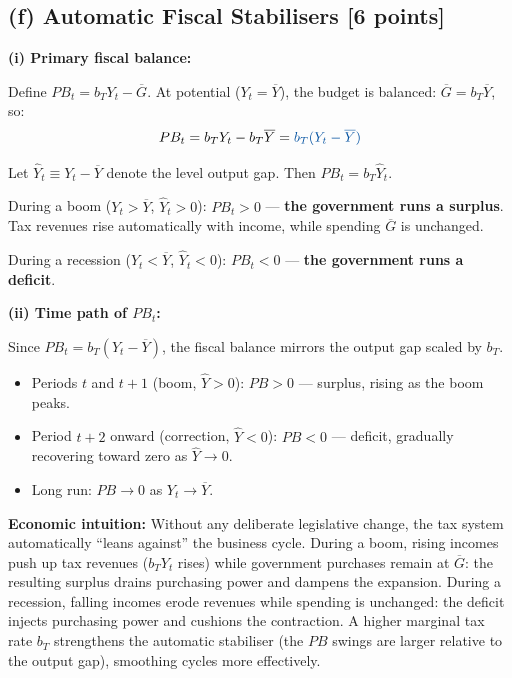 \documentclass[letterpaper,12pt]{article}
\begin{document}
\subsection*{(f) Automatic Fiscal Stabilisers [6 points]}

\noindent\textbf{(i) Primary fiscal balance:}

Define $PB_t = b_T Y_t - \overline{G}$. At potential ($Y_t = \overline{Y}$), the budget is balanced: $\overline{G} = b_T\overline{Y}$, so:
\[
PB_t = b_T Y_t - b_T\overline{Y} = \textcolor{sol}{b_T(Y_t - \overline{Y})}
\]

Let $\hat{Y}_t \equiv Y_t - \overline{Y}$ denote the level output gap. Then $PB_t = b_T \hat{Y}_t$.

During a boom ($Y_t > \overline{Y}$, $\hat{Y}_t > 0$): $PB_t > 0$ — \textbf{the government runs a surplus}. Tax revenues rise automatically with income, while spending $\overline{G}$ is unchanged.

During a recession ($Y_t < \overline{Y}$, $\hat{Y}_t < 0$): $PB_t < 0$ — \textbf{the government runs a deficit}.

\noindent\textbf{(ii) Time path of $PB_t$:}

Since $PB_t = b_T(Y_t - \overline{Y})$, the fiscal balance mirrors the output gap scaled by $b_T$.

\begin{itemize}
  \item Periods $t$ and $t+1$ (boom, $\hat{Y} > 0$): $PB > 0$ — surplus, rising as the boom peaks.
  \item Period $t+2$ onward (correction, $\hat{Y} < 0$): $PB < 0$ — deficit, gradually recovering toward zero as $\hat{Y} \to 0$.
  \item Long run: $PB \to 0$ as $Y_t \to \overline{Y}$.
\end{itemize}

\noindent\textbf{Economic intuition:} Without any deliberate legislative change, the tax system automatically ``leans against'' the business cycle. During a boom, rising incomes push up tax revenues ($b_T Y_t$ rises) while government purchases remain at $\overline{G}$: the resulting surplus drains purchasing power and dampens the expansion. During a recession, falling incomes erode revenues while spending is unchanged: the deficit injects purchasing power and cushions the contraction. A higher marginal tax rate $b_T$ strengthens the automatic stabiliser (the $PB$ swings are larger relative to the output gap), smoothing cycles more effectively.
\end{document}
